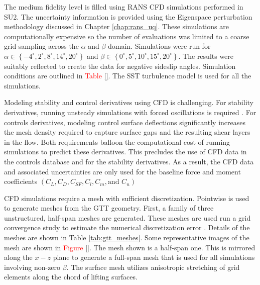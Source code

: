 The medium fidelity level is filled using RANS CFD simulations performed in SU2.
The uncertainty information is provided using the Eigenspace perturbation methodology discussed in Chapter \ref{chap:rans_uq}.
These simulations are computationally expensive so the number of evaluations was limited to a coarse grid-sampling across the $\alpha$ and $\beta$ domain.
Simulations were run for $\alpha \in \left \{ -4^\circ,2^\circ,8^\circ,14^\circ,20^\circ \right \}$ and $\beta \in \left \{ 0^\circ,5^\circ,10^\circ,15^\circ,20^\circ \right \}$.
The results were suitably reflected to create the data for negative sideslip angles. 
Simulation conditions are outlined in \textcolor{red}{Table \ref{}}. 
The SST turbulence model is used for all the simulations.

Modeling stability and control derivatives using CFD is challenging.
For stability derivatives, running unsteady simulations with forced oscillations is required \cite{mcmillin_computational_2019}. 
For controls derivatives, modeling control surface deflections significantly increases the mesh density required to capture surface gaps and the resulting shear layers in the flow. 
Both requirements balloon the computational cost of running simulations to predict these derivatives. 
This precludes the use of CFD data in the controls database and for the stability derivatives.
As a result, the CFD data and associated uncertainties are only used for the baseline force and moment coefficients $\left ( C_L, C_D, C_{SF}, C_l, C_m, \text{and }C_n\right )$

CFD simulations require a mesh with sufficient discretization.
Pointwise is used to generate meshes from the GTT geometry. 
First, a family of three unstructured, half-span meshes are generated.
These meshes are used run a grid convergence study to estimate the numerical discretization error \cite{american_society_of_mechanical_engineers_standard_2009}. 
Details of the meshes are shown in Table \ref{tab:gtt_meshes}.
Some representative images of the mesh are shown in \textcolor{red}{Figure \ref{}}.
The mesh shown is a half-span one.
This is mirrored along the $x-z$ plane to generate a full-span mesh that is used for all simulations involving non-zero $\beta$.
The surface mesh utilizes anisotropic stretching of grid elements along the chord of lifting surfaces. 

